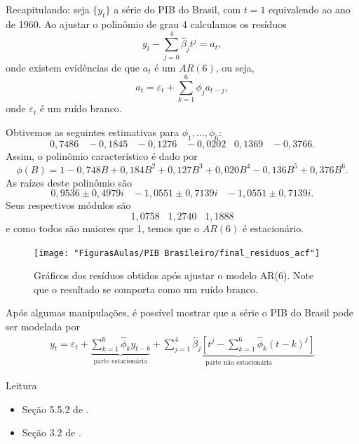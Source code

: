 \documentclass[
  letterpaper,
  DIV=11,
  numbers=noendperiod]{scrreprt}
\theoremstyle{definition}
\theoremstyle{plain}
\theoremstyle{definition}
\theoremstyle{plain}
\theoremstyle{remark}
\begin{document}
\begin{frame}
    Recapitulando: seja $\{y_t\}$ a série do PIB do Brasil, com $t=1$ equivalendo ao ano de 1960. Ao ajustar o polinômio de grau 4 calculamos os resíduos
    $$y_t - \sum_{j=0}^4 \hat{\beta}_j t^j = a_t,$$
    onde existem evidências de que $a_t$ é um $AR(6)$, ou seja,
    $$a_t = \varepsilon_t + \sum_{k=1}^{6}\phi_j a_{t-j},$$
    onde $\varepsilon_t$ é um ruído branco.
\end{frame}

\begin{frame}
    Obtivemos as seguintes estimativas para $\phi_1,\ldots,\phi_6$:
    $$0,7486\;\;\;-0,1845\;\;\;-0,1276\;\;\;-0,0202\;\;\;0,1369\;\;\;-0,3766.$$
    Assim, o polinômio característico é dado por
    $$\phi(B)=1-0,748B+0,184B^2+0,127B^3+0,020B^4-0,136B^5+0,376B^6.$$
    As raízes deste polinômio são
    $$0,9536\pm 0,4979i \;\;\; -1,0551\pm 0,7139i\;\;\; - 1,0551\pm 0,7139i.$$
    Seus respectivos módulos são
    $$1,0758\;\;\; 1,2740\;\;\;1,1888$$
    e como todos são maiores que 1, temos que o $AR(6)$ é estacionário.
\end{frame}

\begin{frame}
    \begin{figure}
\centering
\texttt{[image: "FigurasAulas/PIB Brasileiro/final\_residuos\_acf"]}
\caption{Gráficos dos resíduos obtidos após ajustar o modelo AR(6). Note que o resultado se comporta como um ruído branco.}
\label{fig:final_residuos_acf}
\end{figure}
\end{frame}

\begin{frame}
    Após algumas manipulações, é possível mostrar que a série o PIB do Brasil pode ser modelada por
    \begin{align*}
    y_t = \varepsilon_t + \underbrace{\sum_{k=1}^6 \hat{\phi}_k y_{t-k}}_{\text{parte estacionária}} + \underbrace{\sum_{j=1}^{4}\hat{\beta}_j\left[t^j -\sum_{k=1}^{6}\hat{\phi}_k(t-k)^j\right]}_{\text{parte não estacionária}}
    \end{align*}
\end{frame}

\begin{frame}{Leitura}
    \begin{itemize}
        \item Seção 5.5.2 de \cite{morettin2006analise}.
        \item Seção 3.2 de \cite{box2015time}.
    \end{itemize}
\end{frame}
\end{document}
